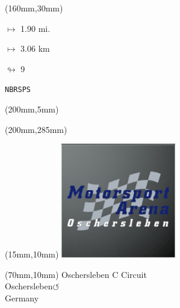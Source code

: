 \begin{textblock*}{40mm}(160mm,30mm)%
\Large
\par$\mapsto$ 1.90 mi.
\par$\mapsto$ 3.06 km
\par$\looparrowright$ 9
\par\hfill\tiny\tt NBRSPS\\
\end{textblock*}
\begin{textblock*}{20mm}(200mm,5mm)%
\fbox{\thepage}
\label{NBRSPS}
\end{textblock*}
\begin{textblock*}{20mm}(200mm,285mm)%
\fbox{\thepage}
\end{textblock*}

\null\newpage
\begin{textblock*}{50mm}(15mm,10mm)%
\includegraphics[width=50mm]{LG/2015-05-20_00090.png}
\end{textblock*}
\begin{textblock*}{130mm}(70mm,10mm)%
{\fontsize{20}{20}\selectfont Oschersleben C Circuit\\}
{\fontsize{16}{16}\selectfont Oschersleben\hfill \huge$\circlearrowleft$\\}
{\fontsize{12}{12}\selectfont Germany\\}
\end{textblock*}
